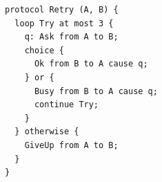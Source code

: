 \begin{lstlisting}[language={},basicstyle=\ttfamily\footnotesize,breaklines=true]
protocol Retry (A, B) {
  loop Try at most 3 {
    q: Ask from A to B;
    choice {
      Ok from B to A cause q;
    } or {
      Busy from B to A cause q;
      continue Try;
    }
  } otherwise {
    GiveUp from A to B;
  }
}
\end{lstlisting}
